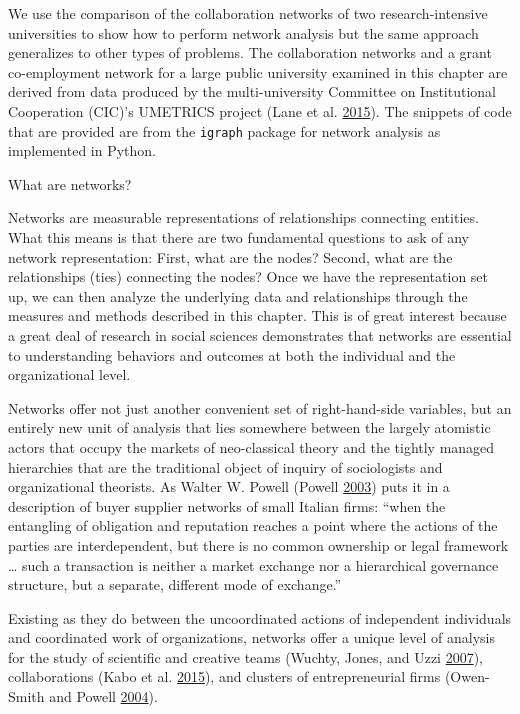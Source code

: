 \documentclass[]{krantz}
\begin{document}
We use the comparison of the collaboration networks of two
research-intensive universities to show how to perform network analysis
but the same approach generalizes to other types of problems. The
collaboration networks and a grant co-employment network for a large
public university examined in this chapter are derived from data
produced by the multi-university Committee on Institutional Cooperation
(CIC)'s UMETRICS project (Lane et al.
\protect\hyperlink{ref-lane2015new}{2015}). The snippets of code that
are provided are from the \texttt{igraph} package for network analysis
as implemented in Python.

What are networks?

Networks are measurable representations of relationships connecting
entities. What this means is that there are two fundamental questions to
ask of any network representation: First, what are the nodes? Second,
what are the relationships (ties) connecting the nodes? Once we have the
representation set up, we can then analyze the underlying data and
relationships through the measures and methods described in this
chapter. This is of great interest because a great deal of research in
social sciences demonstrates that networks are essential to
understanding behaviors and outcomes at both the individual and the
organizational level.

Networks offer not just another convenient set of right-hand-side
variables, but an entirely new unit of analysis that lies somewhere
between the largely atomistic actors that occupy the markets of
neo-classical theory and the tightly managed hierarchies that are the
traditional object of inquiry of sociologists and organizational
theorists. As Walter W. Powell (Powell
\protect\hyperlink{ref-powell2003neither}{2003}) puts it in a
description of buyer supplier networks of small Italian firms: ``when
the entangling of obligation and reputation reaches a point where the
actions of the parties are interdependent, but there is no common
ownership or legal framework \ldots{} such a transaction is neither a
market exchange nor a hierarchical governance structure, but a separate,
different mode of exchange.''

Existing as they do between the uncoordinated actions of independent
individuals and coordinated work of organizations, networks offer a
unique level of analysis for the study of scientific and creative teams
(Wuchty, Jones, and Uzzi
\protect\hyperlink{ref-wuchty2007increasing}{2007}), collaborations
(Kabo et al. \protect\hyperlink{ref-kabo2015shared}{2015}), and clusters
of entrepreneurial firms (Owen-Smith and Powell
\protect\hyperlink{ref-owen2004knowledge}{2004}).
\end{document}
